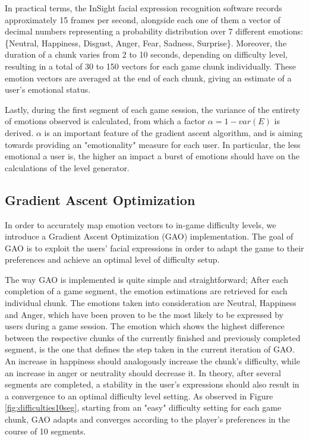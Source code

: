 \documentclass[11pt]{article}
\begin{document}
In practical terms, the InSight facial expression recognition software records approximately 15 frames per second, alongside each one of them a vector of decimal numbers representing a probability distribution over 7 different emotions: \{Neutral, Happiness, Disgust, Anger, Fear, Sadness, Surprise\}. Moreover, the duration of a chunk varies from 2 to 10 seconds, depending on difficulty level, resulting in a total of 30 to 150 vectors for each game chunk individually. These emotion vectors are averaged at the end of each chunk, giving an estimate of a user's emotional status.

Lastly, during the first segment of each game session, the variance of the entirety of emotions observed is calculated, from which a factor $\alpha = 1 - var(E)$ is derived. $\alpha$ is an important feature of the gradient ascent algorithm, and is aiming towards providing an "emotionality" measure for each user. In particular, the less emotional a user is, the higher an impact a burst of emotions should have on the calculations of the level generator.

\subsection*{Gradient Ascent Optimization}

In order to accurately map emotion vectors to in-game difficulty levels, we introduce a Gradient Ascent Optimization (GAO) implementation. The goal of GAO is to exploit the users' facial expressions in order to adapt the game to their preferences and achieve an optimal level of difficulty setup.

The way GAO is implemented is quite simple and straightforward; After each completion of a game segment, the emotion estimations are retrieved for each individual chunk. The emotions taken into consideration are Neutral, Happiness and Anger, which have been proven to be the most likely to be expressed by users during a game session. The emotion which shows the highest difference between the respective chunks of the currently finished and previously completed segment, is the one that defines the step taken in the current iteration of GAO. An increase in happiness should analogously increase the chunk's difficulty, while an increase in anger or neutrality should decrease it. In theory, after several segments are completed, a stability in the user's expressions should also result in a convergence to an optimal difficulty level setting. As observed in Figure \ref{fig:difficulties10seg}, starting from an "easy" difficulty setting for each game chunk, GAO adapts and converges according to the player's preferences in the course of 10 segments.
\end{document}
